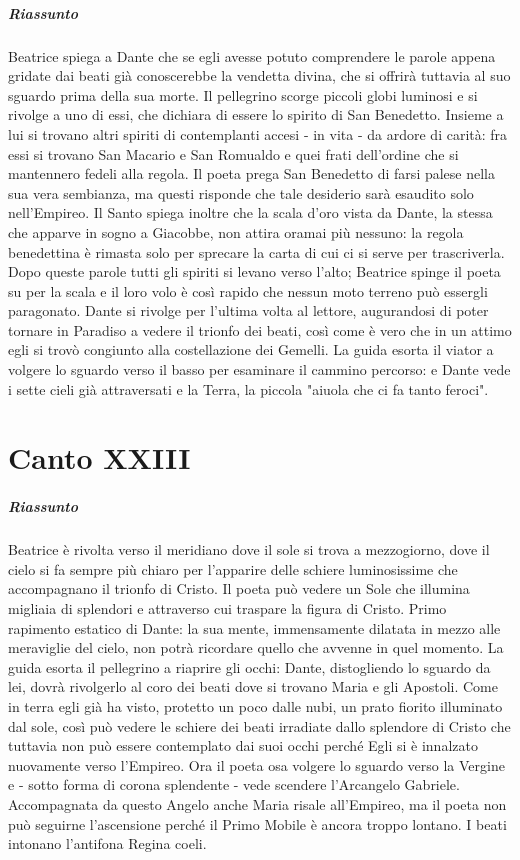 \documentclass[a4paper, twoside, titlepage]{book}
\begin{document}
\paragraph{Riassunto} Beatrice spiega a Dante che se egli avesse potuto comprendere le parole appena gridate dai beati già conoscerebbe la vendetta divina, che si offrirà tuttavia al suo sguardo prima della sua morte. Il pellegrino scorge piccoli globi luminosi e si rivolge a uno di essi, che dichiara di essere lo spirito di San Benedetto. Insieme a lui si trovano altri spiriti di contemplanti accesi - in vita - da ardore di carità: fra essi si trovano San Macario e San Romualdo e quei frati dell’ordine che si mantennero fedeli alla regola. Il poeta prega San Benedetto di farsi palese nella sua vera sembianza, ma questi risponde che tale desiderio sarà esaudito solo nell’Empireo. Il Santo spiega inoltre che la scala d’oro vista da Dante, la stessa che apparve in sogno a Giacobbe, non attira oramai più nessuno: la regola benedettina è rimasta solo per sprecare la carta di cui ci si serve per trascriverla. Dopo queste parole tutti gli spiriti si levano verso l’alto; Beatrice spinge il poeta su per la scala e il loro volo è così rapido che nessun moto terreno può essergli paragonato. Dante si rivolge per l’ultima volta al lettore, augurandosi di poter tornare in Paradiso a vedere il trionfo dei beati, così come è vero che in un attimo egli si trovò congiunto alla costellazione dei Gemelli. La guida esorta il viator a volgere lo sguardo verso il basso per esaminare il cammino percorso: e Dante vede i sette cieli già attraversati e la Terra, la piccola "aiuola che ci fa tanto feroci".

\chapter{Canto XXIII}

\paragraph{Riassunto} Beatrice è rivolta verso il meridiano dove il sole si trova a mezzogiorno, dove il cielo si fa sempre più chiaro per l’apparire delle schiere luminosissime che accompagnano il trionfo di Cristo. Il poeta può vedere un Sole che illumina migliaia di splendori e attraverso cui traspare la figura di Cristo. Primo rapimento estatico di Dante: la sua mente, immensamente dilatata in mezzo alle meraviglie del cielo, non potrà ricordare quello che avvenne in quel momento. La guida esorta il pellegrino a riaprire gli occhi: Dante, distogliendo lo sguardo da lei, dovrà rivolgerlo al coro dei beati dove si trovano Maria e gli Apostoli. Come in terra egli già ha visto, protetto un poco dalle nubi, un prato fiorito illuminato dal sole, così può vedere le schiere dei beati irradiate dallo splendore di Cristo che tuttavia non può essere contemplato dai suoi occhi perché Egli si è innalzato nuovamente verso l’Empireo. Ora il poeta osa volgere lo sguardo verso la Vergine e - sotto forma di corona splendente - vede scendere l’Arcangelo Gabriele. Accompagnata da questo Angelo anche Maria risale all’Empireo, ma il poeta non può seguirne l’ascensione perché il Primo Mobile è ancora troppo lontano. I beati intonano l’antifona Regina coeli.
\end{document}
